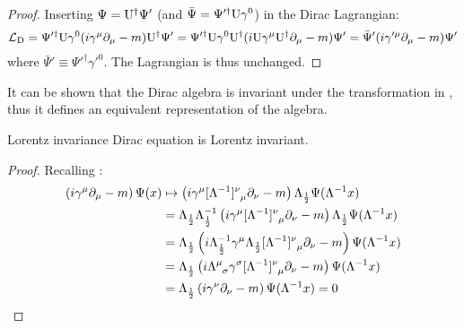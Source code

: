 \begin{proofbox}
  \begin{proof}
    Inserting $ \Psi = \mathrm{U}^\dagger \Psi' $ (and $ \bar{\Psi} = \Psi'^\dagger \mathrm{U} \gamma^0 $) in the Dirac Lagrangian:
    \begin{equation*}
      \mathcal{L}_\text{D} = \Psi'^\dagger \mathrm{U} \gamma^0 (i \gamma^\mu \partial_\mu - m) \mathrm{U}^\dagger \Psi' = \Psi'^\dagger \mathrm{U} \gamma^0 \mathrm{U}^\dagger (i \mathrm{U} \gamma^\mu \mathrm{U}^\dagger \partial_\mu - m) \Psi' = \bar{\Psi}' (i \gamma'^\mu \partial_\mu - m) \Psi'
    \end{equation*}
    where $ \bar{\Psi}' \equiv \Psi'^\dagger \gamma'^0 $. The Lagrangian is thus unchanged.
  \end{proof}
\end{proofbox}

It can be shown that the Dirac algebra is invariant under the transformation in , thus it defines an equivalent representation of the algebra.

\begin{proposition}{Lorentz invariance}{}
  Dirac equation is Lorentz invariant.
\end{proposition}

\begin{proofbox}
  \begin{proof}
    Recalling :
    \begin{equation*}
      \begin{split}
        \left( i \gamma^\mu \pa_\mu - m \right) \Psi(x)
        &\mapsto \left( i \gamma^\mu \tensor{[\Lambda^{-1}]}{^\nu_\mu} \pa_\nu - m \right) \Lambda_{\frac{1}{2}} \Psi(\Lambda^{-1}x) \\
        &= \Lambda_{\frac{1}{2}} \Lambda_{\frac{1}{2}}^{-1} \left( i \gamma^\mu \tensor{[\Lambda^{-1}]}{^\nu_\mu} \pa_\nu - m \right) \Lambda_{\frac{1}{2}} \Psi(\Lambda^{-1}x) \\
        &= \Lambda_{\frac{1}{2}} \left( i \Lambda_{\frac{1}{2}}^{-1} \gamma^\mu \Lambda_{\frac{1}{2}} \tensor{[\Lambda^{-1}]}{^\nu_\mu} \pa_\nu - m \right) \Psi(\Lambda^{-1}x) \\
        &= \Lambda_{\frac{1}{2}} \left( i \tensor{\Lambda}{^\mu_\sigma} \gamma^\sigma \tensor{[\Lambda^{-1}]}{^\nu_\mu} \pa_\nu - m \right) \Psi(\Lambda^{-1}x) \\
        &= \Lambda_{\frac{1}{2}} \left( i \gamma^\nu \pa_\nu - m \right) \Psi(\Lambda^{-1}x) = 0
      \end{split}
    \end{equation*}
  \end{proof}
\end{proofbox}

